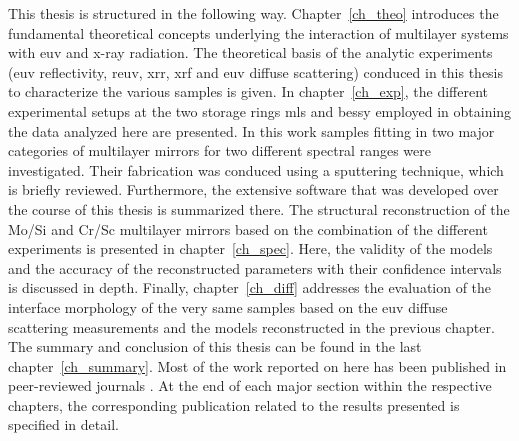 This thesis is structured in the following way. Chapter~\ref{ch_theo} introduces the fundamental theoretical concepts underlying the interaction of multilayer systems with \gls{euv} and x-ray radiation. The theoretical basis of the analytic experiments (\gls{euv} reflectivity, \gls{reuv}, \gls{xrr}, \gls{xrf} and \gls{euv} diffuse scattering) conduced in this thesis to characterize the various samples is given. In chapter~\ref{ch_exp}, the different experimental setups at the two storage rings \gls{mls} and \gls{bessy} employed in obtaining the data analyzed here are presented. In this work samples fitting in two major categories of multilayer mirrors for two different spectral ranges were investigated. Their fabrication was conduced using a sputtering technique, which is briefly reviewed. Furthermore, the extensive software that was developed over the course of this thesis is summarized there. The structural reconstruction of the Mo/Si and Cr/Sc multilayer mirrors based on the combination of the different experiments is presented in chapter~\ref{ch_spec}. Here, the validity of the models and the accuracy of the reconstructed parameters with their confidence intervals is discussed in depth. Finally, chapter~\ref{ch_diff} addresses the evaluation of the interface morphology of the very same samples based on the \gls{euv} diffuse scattering measurements and the models reconstructed in the previous chapter. The summary and conclusion of this thesis can be found in the last chapter~\ref{ch_summary}. Most of the work reported on here has been published in peer-reviewed journals \cite{haase_role_2014, haase_multiparameter_2016, haase_interface_2017}. At the end of each major section within the respective chapters, the corresponding publication related to the results presented is specified in detail.
